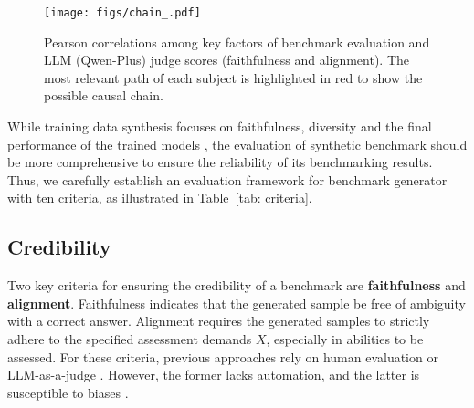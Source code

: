 \begin{figure*}[h]
\centering
\texttt{[image: figs/chain\_.pdf]}
\vspace{-10pt}
\caption{{Pearson correlations among key factors of benchmark evaluation and LLM (Qwen-Plus) judge scores (faithfulness and alignment). The most relevant path of each subject is highlighted in red to show the possible causal chain.}}
\vspace{-7pt}
\label{fig:chain}
\end{figure*}

While training data synthesis focuses on faithfulness, diversity and the final performance of the trained models \citep{attr,datasurvey2}, the evaluation of synthetic benchmark should be more comprehensive to ensure the reliability of its benchmarking results. Thus, we carefully establish an evaluation framework for benchmark generator with ten criteria, as illustrated in Table~\ref{tab: criteria}.
% 
\subsection{Credibility}
\label{sec:credibility}
Two key criteria for ensuring the credibility of a benchmark are \textbf{faithfulness} and \textbf{alignment}. Faithfulness indicates that the generated sample be free of ambiguity with a correct answer. Alignment requires the generated samples to strictly adhere to the specified assessment demands $X$, especially in abilities to be assessed. 
For these criteria, previous approaches rely on human evaluation \citep{unigen,dyval2} or LLM-as-a-judge \citep{llmasjudge}. However, the former lacks automation, and the latter is susceptible to biases \citep{judgingjudge}. 


